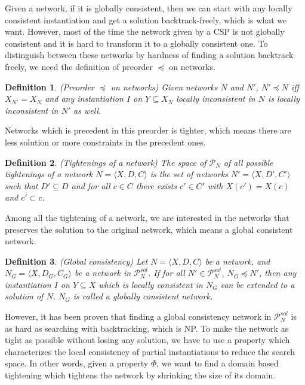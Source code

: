 \documentclass[a4paper, 12pt]{report}
\newtheorem{definition}{Definition}[subsection]
\begin{document}
            Given a network, if it is globally consistent, then we can start with any locally consistent instantiation and get a solution backtrack-freely, which is what we want. However, most of the time the network given by a CSP is not globally consistent and it is hard to transform it to a globally consistent one. To distinguish between these networks by hardness of finding a solution backtrack freely, we need the definition of preorder $\preceq$ on networks.

            \begin{definition}
                (Preorder $\preceq$ on networks\cite{rossi2006handbook}) Given networks $N$ and $N'$, $N'\preceq N$ iff $X_{N'}=X_N$ and any instantiation $I$ on $Y\subseteq X_N$ locally inconsistent in $N$ is locally inconsistent in $N'$ as well.
            \end{definition}

            Networks which is precedent in this preorder is tighter, which means there are less solution or more constraints in the precedent ones.

            \begin{definition}
                (Tightenings of a network\cite{rossi2006handbook}) The space of $\mathcal P_N$ of all possible tightenings of a network $N=\langle X,D,C\rangle$ is the set of networks $N'=\langle X,D',C'\rangle$ such that $D'\subseteq D$ and for all $c\in C$ there exists $c'\in C'$ with $X(c')=X(c)$ and $c'\subset c$.
            \end{definition}

            Among all the tightening of a network, we are interested in the networks that preserves the solution to the original network, which means a global consistent network.

            \begin{definition}
                (Global consistency\cite{rossi2006handbook}) Let $N=\langle X,D,C\rangle$ be a network, and $N_G=\langle X,D_G,C_G\rangle$ be a network in $\mathcal P^{sol}_N$. If for all $N'\in \mathcal P^{sol}_N$, $N_G\preceq N'$, then any instantiation $I$ on $Y\subseteq X$ which is locally consistent in $N_G$ can be extended to a solution of $N$. $N_G$ is called a globally consistent network.
            \end{definition}

            However, it has been proven that finding a global consistency network in $\mathcal P^{sol}_N$ is as hard as searching with backtracking, which is NP. To make the network as tight as possible without losing any solution, we have to use a property which characterizes the local consistency of partial instantiations to reduce the search space. In other words, given a property $\Phi$, we want to find a domain based tightening which tightens the network by
            shrinking the size of its domain.
\end{document}
